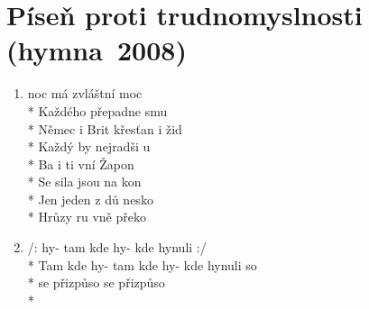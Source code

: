 \section{Píseň proti trudnomyslnosti (hymna~2008)}
\begin{enumerate}
\item[]  noc má zvláštní moc \\*
Každého přepadne smu \\*
Němec i Brit křesťan i žid \\*
Každý by nejradši u \\*
Ba i ti vní Žapon \\*
Se sila jsou na kon \\*
Jen jeden z dů nesko \\*
Hrůzy ru vně překo 
\item[] /:  hy- tam kde hy- kde hynuli  :/ \\*
Tam kde hy- tam kde hy- kde hynuli so \\*
 se přizpůso  se přizpůso  \\*
\end{enumerate}
